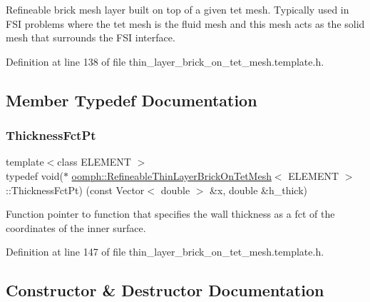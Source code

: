 Refineable brick mesh layer built on top of a given tet mesh. Typically used in F\+SI problems where the tet mesh is the fluid mesh and this mesh acts as the solid mesh that surrounds the F\+SI interface. 

Definition at line 138 of file thin\+\_\+layer\+\_\+brick\+\_\+on\+\_\+tet\+\_\+mesh.\+template.\+h.



\subsection{Member Typedef Documentation}
\mbox{\label{classoomph_1_1RefineableThinLayerBrickOnTetMesh_a744583cb70486874441d5a748f23168d}} 
\subsubsection{\texorpdfstring{Thickness\+Fct\+Pt}{ThicknessFctPt}}
{\footnotesize\ttfamily template$<$class E\+L\+E\+M\+E\+NT $>$ \\
typedef void($\ast$ \hyperlink{classoomph_1_1RefineableThinLayerBrickOnTetMesh}{oomph\+::\+Refineable\+Thin\+Layer\+Brick\+On\+Tet\+Mesh}$<$ E\+L\+E\+M\+E\+NT $>$\+::Thickness\+Fct\+Pt) (const Vector$<$ double $>$ \&x, double \&h\+\_\+thick)}



Function pointer to function that specifies the wall thickness as a fct of the coordinates of the inner surface. 



Definition at line 147 of file thin\+\_\+layer\+\_\+brick\+\_\+on\+\_\+tet\+\_\+mesh.\+template.\+h.



\subsection{Constructor \& Destructor Documentation}
\mbox{\label{classoomph_1_1RefineableThinLayerBrickOnTetMesh_a3f1a8807362ae98ae73bbf577e858e51}} 
